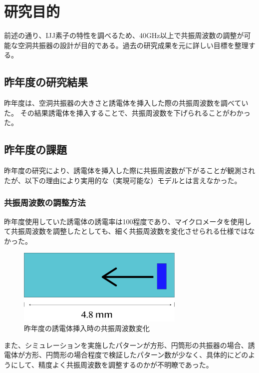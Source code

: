\chapter{研究目的}
前述の通り、IJJ素子の特性を調べるため、40GHz以上で共振周波数の調整が可能な空洞共振器の設計が目的である。過去の研究成果を元に詳しい目標を整理する。

\section{昨年度の研究結果}
昨年度は、空洞共振器の大きさと誘電体を挿入した際の共振周波数を調べていた。\cite{わたなべ}
その結果誘電体を挿入することで、共振周波数を下げられることがわかった。

\section{昨年度の課題}
昨年度の研究により、誘電体を挿入した際に共振周波数が下がることが観測されたが、以下の理由により実用的な（実現可能な）モデルとは言えなかった。


\subsection{共振周波数の調整方法}
昨年度使用していた誘電体の誘電率は100程度であり、マイクロメータを使用して共振周波数を調整したとしても、細く共振周波数を変化させられる仕様ではなかった。

\vspace{10 mm}

\begin{figure}[h]
  \begin{center}
    \includegraphics[width=8cm]{./image/pos.png}
    \caption{昨年度の誘電体挿入時の共振周波数変化}
    \label{fig:Watanabe}
  \end{center}
\end{figure}

また、シミュレーションを実施したパターンが方形、円筒形の共振器の場合、誘電体が方形、円筒形の場合程度で検証したパターン数が少なく、具体的にどのようにして、精度よく共振周波数を調整するのかが不明瞭であった。

